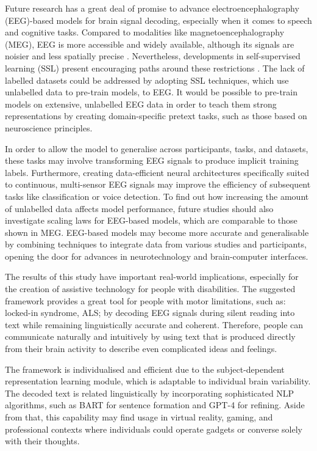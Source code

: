 \documentclass[journal]{IEEEtran}
\begin{document}
Future research has a great deal of promise to advance electroencephalography (EEG)-based models for brain signal decoding, especially when it comes to speech and cognitive tasks. Compared to modalities like magnetoencephalography (MEG), EEG is more accessible and widely available, although its signals are noisier and less spatially precise \cite{Jayalath2024}. Nevertheless, developments in self-supervised learning (SSL) present encouraging paths around these restrictions \cite{Jayalath2024}. The lack of labelled datasets could be addressed by adopting SSL techniques, which use unlabelled data to pre-train models, to EEG. It would be possible to pre-train models on extensive, unlabelled EEG data in order to teach them strong representations by creating domain-specific pretext tasks, such as those based on neuroscience principles.


In order to allow the model to generalise across participants, tasks, and datasets, these tasks may involve transforming EEG signals to produce implicit training labels. Furthermore, creating data-efficient neural architectures specifically suited to continuous, multi-sensor EEG signals may improve the efficiency of subsequent tasks like classification or voice detection. To find out how increasing the amount of unlabelled data affects model performance, future studies should also investigate scaling laws for EEG-based models, which are comparable to those shown in MEG. EEG-based models may become more accurate and generalisable by combining techniques to integrate data from various studies and participants, opening the door for advances in neurotechnology and brain-computer interfaces.
    
The results of this study have important real-world implications, especially for the creation of assistive technology for people with disabilities. The suggested framework provides a great tool for people with motor limitations, such as: locked-in syndrome, ALS; by decoding EEG signals during silent reading into text while remaining linguistically accurate and coherent. Therefore, people can communicate naturally and intuitively by using text that is produced directly from their brain activity to describe even complicated ideas and feelings.
    
The framework is individualised and efficient due to the subject-dependent representation learning module, which is adaptable to individual brain variability. The decoded text is related linguistically by incorporating sophisticated NLP algorithms, such as BART for sentence formation and GPT-4 for refining. Aside from that, this capability may find usage in virtual reality, gaming, and professional contexts where individuals could operate gadgets or converse solely with their thoughts.
\end{document}
